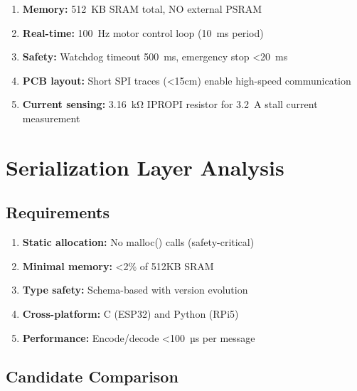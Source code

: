 \documentclass[12pt,letterpaper]{article}
\begin{document}
\begin{enumerate}
    \item \textbf{Memory:} 512~KB SRAM total, NO external PSRAM
    \item \textbf{Real-time:} 100~Hz motor control loop (10~ms period)
    \item \textbf{Safety:} Watchdog timeout 500~ms, emergency stop <20~ms
    \item \textbf{PCB layout:} Short SPI traces (<15cm) enable high-speed communication
    \item \textbf{Current sensing:} 3.16~kΩ IPROPI resistor for 3.2~A stall current measurement
\end{enumerate}

\section{Serialization Layer Analysis}

\subsection{Requirements}

\begin{enumerate}
    \item \textbf{Static allocation:} No malloc() calls (safety-critical)
    \item \textbf{Minimal memory:} <2\% of 512KB SRAM
    \item \textbf{Type safety:} Schema-based with version evolution
    \item \textbf{Cross-platform:} C (ESP32) and Python (RPi5)
    \item \textbf{Performance:} Encode/decode <100~µs per message
\end{enumerate}

\subsection{Candidate Comparison}
\end{document}
